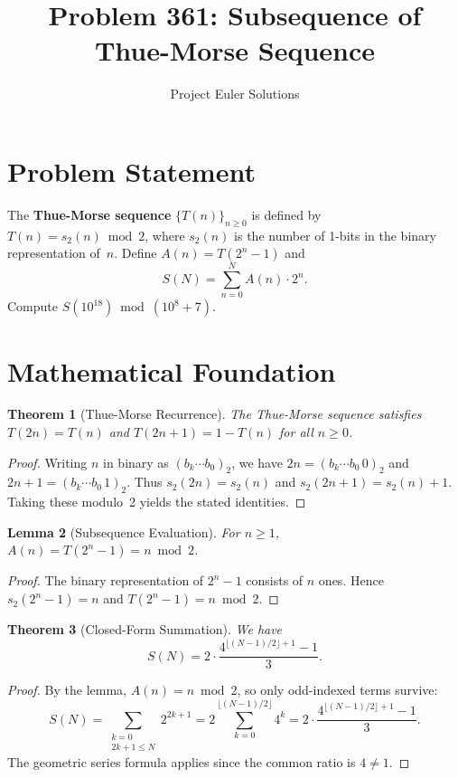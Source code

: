 \documentclass[11pt]{article}
\title{Problem 361: Subsequence of Thue-Morse Sequence}
\author{Project Euler Solutions}
\date{}
\newtheorem{theorem}{Theorem}
\newtheorem{lemma}[theorem]{Lemma}
\begin{document}
\maketitle

\section{Problem Statement}

The \textbf{Thue-Morse sequence} $\{T(n)\}_{n \ge 0}$ is defined by $T(n) = s_2(n) \bmod 2$, where $s_2(n)$ is the number of 1-bits in the binary representation of~$n$. Define $A(n) = T(2^n - 1)$ and
\[
S(N) = \sum_{n=0}^{N} A(n) \cdot 2^n.
\]
Compute $S(10^{18}) \bmod (10^8 + 7)$.

\section{Mathematical Foundation}

\begin{theorem}[Thue-Morse Recurrence]
The Thue-Morse sequence satisfies $T(2n) = T(n)$ and $T(2n+1) = 1 - T(n)$ for all $n \ge 0$.
\end{theorem}

\begin{proof}
Writing $n$ in binary as $(b_k \cdots b_0)_2$, we have $2n = (b_k \cdots b_0\, 0)_2$ and $2n+1 = (b_k \cdots b_0\, 1)_2$. Thus $s_2(2n) = s_2(n)$ and $s_2(2n+1) = s_2(n) + 1$. Taking these modulo~2 yields the stated identities.
\end{proof}

\begin{lemma}[Subsequence Evaluation]
For $n \ge 1$, $A(n) = T(2^n - 1) = n \bmod 2$.
\end{lemma}

\begin{proof}
The binary representation of $2^n - 1$ consists of $n$ ones. Hence $s_2(2^n - 1) = n$ and $T(2^n - 1) = n \bmod 2$.
\end{proof}

\begin{theorem}[Closed-Form Summation]
We have
\[
S(N) = 2 \cdot \frac{4^{\lfloor (N-1)/2 \rfloor + 1} - 1}{3}.
\]
\end{theorem}

\begin{proof}
By the lemma, $A(n) = n \bmod 2$, so only odd-indexed terms survive:
\[
S(N) = \sum_{\substack{k=0 \\ 2k+1 \le N}} 2^{2k+1} = 2\sum_{k=0}^{\lfloor(N-1)/2\rfloor} 4^k = 2 \cdot \frac{4^{\lfloor(N-1)/2\rfloor+1}-1}{3}.
\]
The geometric series formula applies since the common ratio is $4 \neq 1$.
\end{proof}
\end{document}
